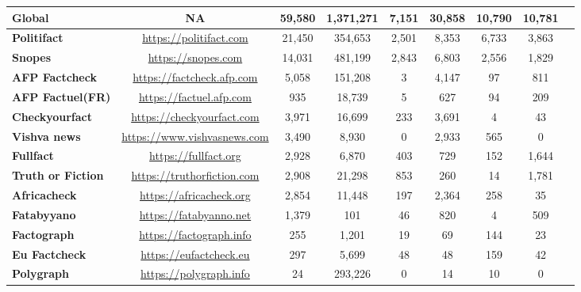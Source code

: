 \documentclass[
]{ceurart}
\begin{document}
\begin{table}[t]
\begin{tabular}{|l|c|c|c|c|c|c|c|c|}
\textbf{Global}  & NA       & 59,580        & 1,371,271         & 7,151        & 30,858        & 10,790          & 10,781        \\ \hline
\textbf{Politifact }  &{\url{https://politifact.com}}    & 21,450        & 354,653          & 2,501        & 8,353         & 6,733           & 3,863         \\ \hline
\textbf{Snopes}  & {\url{https://snopes.com}}       & 14,031        & 481,199          & 2,843        & 6,803         & 2,556           & 1,829         \\ \hline
\textbf{AFP Factcheck} & {\url{https://factcheck.afp.com}}  & 5,058         & 151,208          & 3           & 4,147         & 97             & 811          \\ \hline
\textbf{AFP Factuel(FR)} &{\url{https://factuel.afp.com}}  & 935          & 18,739           & 5           & 627          & 94             & 209          \\ \hline
\textbf{Checkyourfact} & {\url{https://checkyourfact.com}}  & 3,971         & 16,699           & 233         & 3,691         & 4              & 43           \\ \hline
\textbf{Vishva news} &{\url{https://www.vishvasnews.com}}     & 3,490         & 8,930            & 0           & 2,933         & 565            & 0            \\ \hline
\textbf{Fullfact}  &{\url{https://fullfact.org} }      & 2,928         & 6,870            & 403         & 729          & 152            & 1,644         \\ \hline
\textbf{Truth or Fiction} &{\url{https://truthorfiction.com}} & 2,908         & 21,298           & 853         & 260          & 14             & 1,781         \\ \hline
\textbf{Africacheck}  &{\url{https://africacheck.org}}    & 2,854         & 11,448           & 197         & 2,364         & 258            & 35           \\ \hline
\textbf{Fatabyyano} &{\url{https://fatabyanno.net}}      & 1,379         & 101             & 46          & 820          & 4              & 509          \\ \hline
\textbf{Factograph} &{\url{https://factograph.info} }   & 255          & 1,201            & 19          & 69           & 144            & 23           \\ \hline
\textbf{Eu Factcheck} &{\url{https://eufactcheck.eu}}   & 297          & 5,699            & 48          & 48           & 159            & 42           \\ \hline
\textbf{Polygraph}  &{\url{https://polygraph.info}}    & 24           & 293,226          & 0           & 14           & 10             & 0            \\ \hline
\end{tabular}
\vspace{-4mm}
\end{table}
\end{document}
